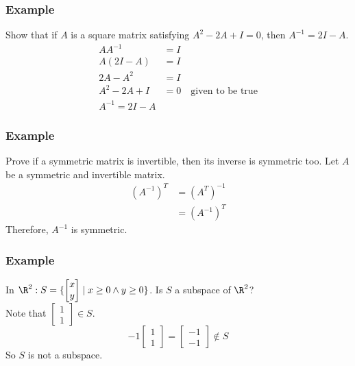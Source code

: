 \documentclass{math}
\begin{document}
\subsubsection*{Example}
Show that if \( A \) is a square matrix satisfying \( A^2-2A+I = 0 \), then
\( A^{-1} = 2I - A \).
\begin{align*}
  AA^{-1} &= I \\
  A(2I-A) &= I \\
  2A-A^2 &= I \\
  A^2-2A+I &= 0 \quad \text{given to be true} \\
  A^{-1} = 2I-A
\end{align*}

\subsubsection*{Example}
Prove if a symmetric matrix is invertible, then its inverse is symmetric too.
Let \( A \) be a symmetric and invertible matrix.
\begin{align*}
  (A^{-1})^T &= (A^T)^{-1} \\
  &= (A^{-1})^T
\end{align*}
Therefore, \( A^{-1} \) is symmetric.

\subsubsection*{Example}
In \( \R^2: S = \{\begin{bmatrix}x \\ y\end{bmatrix}\mid x\ge0 \wedge y\ge0\}
\). Is \( S \) a subspace of \( \R^2 \)? \\
Note that \( \begin{bmatrix}1 \\ 1\end{bmatrix}\in S \).
\[ -1\begin{bmatrix}1 \\ 1\end{bmatrix} = \begin{bmatrix}-1 \\ -1\end{bmatrix}
  \notin S \]
So \( S \) is not a subspace.
\end{document}
